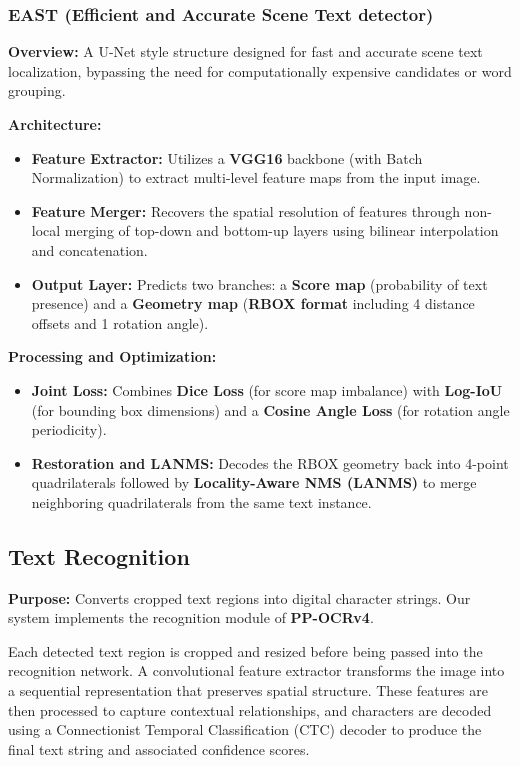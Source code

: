 \subsubsection{EAST (Efficient and Accurate Scene Text detector)}
\textbf{Overview:} A U-Net style structure designed for fast and accurate scene text localization, bypassing the need for computationally expensive candidates or word grouping.

\textbf{Architecture:}
\begin{itemize}
    \item \textbf{Feature Extractor:} Utilizes a \textbf{VGG16} backbone (with Batch Normalization) to extract multi-level feature maps from the input image.
    \item \textbf{Feature Merger:} Recovers the spatial resolution of features through non-local merging of top-down and bottom-up layers using bilinear interpolation and concatenation.
    \item \textbf{Output Layer:} Predicts two branches: a \textbf{Score map} (probability of text presence) and a \textbf{Geometry map} (\textbf{RBOX format} including 4 distance offsets and 1 rotation angle).
\end{itemize}

\textbf{Processing and Optimization:}
\begin{itemize}
    \item \textbf{Joint Loss:} Combines \textbf{Dice Loss} (for score map imbalance) with \textbf{Log-IoU} (for bounding box dimensions) and a \textbf{Cosine Angle Loss} (for rotation angle periodicity).
    \item \textbf{Restoration and LANMS:} Decodes the RBOX geometry back into 4-point quadrilaterals followed by \textbf{Locality-Aware NMS (LANMS)} to merge neighboring quadrilaterals from the same text instance.
\end{itemize}

\subsection{Text Recognition}
\textbf{Purpose:} Converts cropped text regions into digital character strings. Our system implements the recognition module of \textbf{PP-OCRv4}.

\noindent Each detected text region is cropped and resized before being passed into the recognition network. A convolutional feature extractor transforms the image into a sequential representation that preserves spatial structure. These features are then processed to capture contextual relationships, and characters are decoded using a Connectionist Temporal Classification (CTC) decoder to produce the final text string and associated confidence scores.

